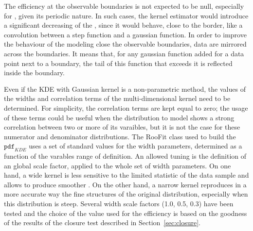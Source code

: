 The efficiency at the observable boundaries is not expected to be null, especially for \PHI, given its periodic nature. 
In such cases, the kernel estimator would introduce a significant decreasing of the \pdf, since it would behave, close to the border, like a convolution between a step function and a gaussian function.
In order to improve the behaviour of the modeling close the observable boundaries, data are mirrored across the boundaries.
It means that, for any gaussian function added for a data point next to a boundary, the tail of this function that exceeds it is reflected inside the boundary.

Even if the KDE with Gaussian kernel is a non-parametric method, the values of the widths and correlation terms of the multi-dimensional kernel need to be determined.
For simplicity, the correlation terms are kept equal to zero; the usage of these terms could be useful when the distribution to model shows a strong correlation between two or more of its varaibles, but it is not the case for these numerator and denominator distributions.
The {\sc RooFit} class used to build the $\mathtt{pdf}_{KDE}$ uses a set of standard values for the width parameters, determined as a function of the varables range of definition.
An allowed tuning is the definition of an global scale factor, applied to the whole set of width parameters.
On one hand, a wide kernel is less sensitive to the limited statistic of the data sample and allows to produce smoother \pdfs.
On the other hand, a narrow kernel reproduces in a more accurate way the fine structures of the original distribution, especially when this distribution is steep.
Several width scale factors (1.0, 0.5, 0.3) have been tested and the choice of the value used for the efficiency is based on the goodness of the results of the closure test described in Section~\ref{sec:closure}.


